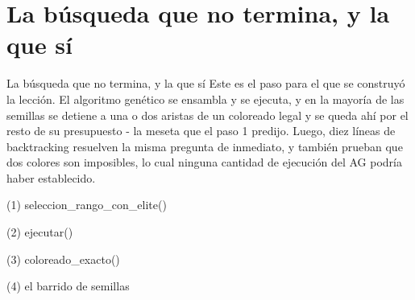 
\section{La búsqueda que no termina, y la que sí}

\begin{frame}{La búsqueda que no termina, y la que sí}
Este es el paso para el que se construyó la lección. El algoritmo genético se ensambla y
se ejecuta, y en la mayoría de las semillas se detiene a una o dos aristas de un coloreado legal y
se queda ahí por el resto de su presupuesto - la meseta que el paso 1 predijo.
Luego, diez líneas de backtracking resuelven la misma pregunta de inmediato, y también prueban
que dos colores son imposibles, lo cual ninguna cantidad de ejecución del AG podría haber
establecido.
\end{frame}

\begin{frame}[fragile]{(1) seleccion\_rango\_con\_elite()}

\end{frame}

\begin{frame}[fragile]{(2) ejecutar()}

\end{frame}

\begin{frame}[fragile]{(3) coloreado\_exacto()}

\end{frame}

\begin{frame}[fragile]{(4) el barrido de semillas}

\end{frame}

